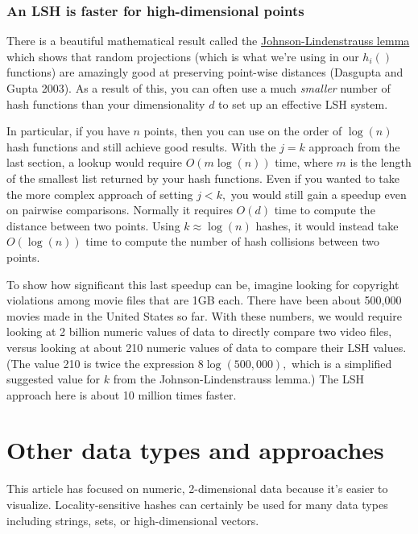\documentclass[20pt,]{extarticle}
\begin{document}
\subsubsection{An LSH is faster for high-dimensional
points}\label{an-lsh-is-faster-for-high-dimensional-points}

There is a beautiful mathematical result called the
\href{https://en.wikipedia.org/wiki/Johnson\%E2\%80\%93Lindenstrauss_lemma}{Johnson-Lindenstrauss
lemma} which shows that random projections (which is what we're using in
our \(h_i()\) functions) are amazingly good at preserving point-wise
distances (Dasgupta and Gupta 2003). As a result of this, you can often
use a much \emph{smaller} number of hash functions than your
dimensionality \(d\) to set up an effective LSH system.

In particular, if you have \(n\) points, then you can use on the order
of \(\log(n)\) hash functions and still achieve good results. With the
\(j=k\) approach from the last section, a lookup would require
\(O(m\log(n))\) time, where \(m\) is the length of the smallest list
returned by your hash functions. Even if you wanted to take the more
complex approach of setting \(j < k,\) you would still gain a speedup
even on pairwise comparisons. Normally it requires \(O(d)\) time to
compute the distance between two points. Using \(k \approx \log(n)\)
hashes, it would instead take \(O(\log(n))\) time to compute the number
of hash collisions between two points.

To show how significant this last speedup can be, imagine looking for
copyright violations among movie files that are 1GB each. There have
been about 500,000 movies made in the United States so far. With these
numbers, we would require looking at 2 billion numeric values of data to
directly compare two video files, versus looking at about 210 numeric
values of data to compare their LSH values. (The value 210 is twice the
expression \(8\log(500,000),\) which is a simplified suggested value for
\(k\) from the Johnson-Lindenstrauss lemma.) The LSH approach here is
about 10 million times faster.

\section{Other data types and
approaches}\label{other-data-types-and-approaches}

This article has focused on numeric, 2-dimensional data because it's
easier to visualize. Locality-sensitive hashes can certainly be used for
many data types including strings, sets, or high-dimensional vectors.
\end{document}
